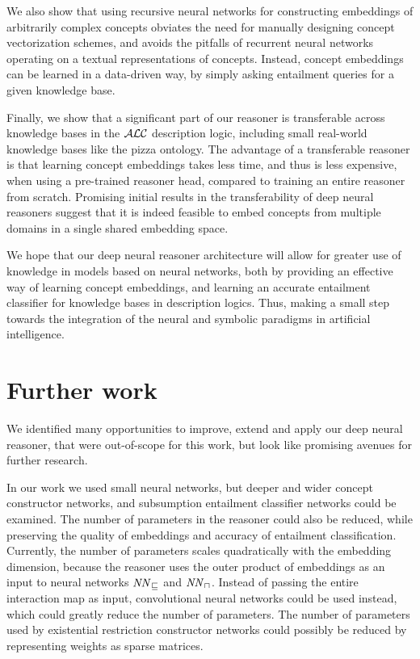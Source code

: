 We also show that using recursive neural networks for constructing embeddings of arbitrarily complex concepts obviates the need for manually designing concept vectorization schemes, and avoids the pitfalls of recurrent neural networks operating on a textual representations of concepts.
Instead, concept embeddings can be learned in a data-driven way, by simply asking entailment queries for a given knowledge base.

Finally, we show that a significant part of our reasoner is transferable across knowledge bases in the $\mathcal{ALC}$ description logic, including small real-world knowledge bases like the pizza ontology.
The advantage of a transferable reasoner is that learning concept embeddings takes less time, and thus is less expensive, when using a pre-trained reasoner head, compared to training an entire reasoner from scratch.
Promising initial results in the transferability of deep neural reasoners suggest that it is indeed feasible to embed concepts from multiple domains in a single shared embedding space.

We hope that our deep neural reasoner architecture will allow for greater use of knowledge in models based on neural networks, both by providing an effective way of learning concept embeddings, and learning an accurate entailment classifier for knowledge bases in description logics.
Thus, making a small step towards the integration of the neural and symbolic paradigms in artificial intelligence.

\section{Further work}
\label{sec:further-work}

We identified many opportunities to improve, extend and apply our deep neural reasoner, that were out-of-scope for this work, but look like promising avenues for further research.

In our work we used small neural networks, but deeper and wider concept constructor networks, and subsumption entailment classifier networks could be examined.
The number of parameters in the reasoner could also be reduced, while preserving the quality of embeddings and accuracy of entailment classification.
Currently, the number of parameters scales quadratically with the embedding dimension, because the reasoner uses the outer product of embeddings as an input to neural networks $\mathit{NN}_\sqsubseteq$ and $\mathit{NN}_\sqcap$.
Instead of passing the entire interaction map as input, convolutional neural networks could be used instead, which could greatly reduce the number of parameters.
The number of parameters used by existential restriction constructor networks could possibly be reduced by representing weights as sparse matrices.


